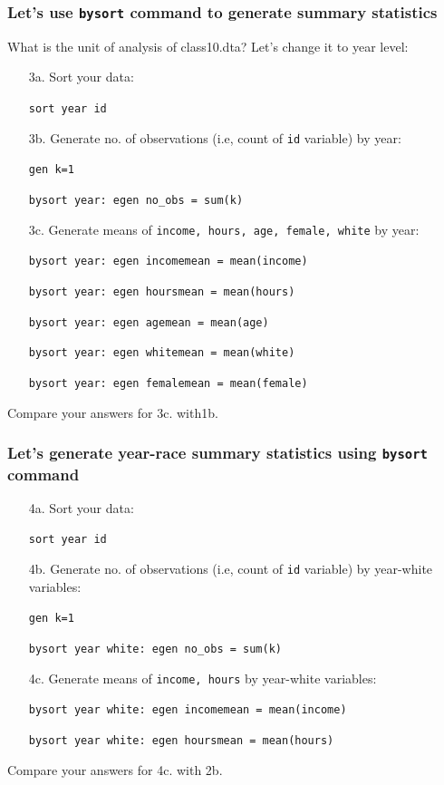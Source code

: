 \documentclass[11pt]{beamer}
\begin{document}
\begin{frame}
\frametitle{Let's use \texttt{bysort} command to generate summary statistics}
What is the unit of analysis of class10.dta? \pause
Let's change it to year level: \\ \pause
\begin{itemize}
	\item[3a.] Sort your data: \pause
	\item[   ] \texttt{sort year id} \pause \bigskip
	\item[3b.] Generate no. of observations (i.e, count of \texttt{id} variable) by year: \pause
	\item[   ] \texttt{gen k=1}
	\item[   ] \texttt{bysort year: egen no\_obs = sum(k)} \pause \bigskip
	\item[3c.] Generate means of \texttt{income, hours, age, female, white} by year: \pause
	\item[   ] \texttt{bysort year: egen incomemean = mean(income)}
	\item[   ] \texttt{bysort year: egen hoursmean = mean(hours)}
	\item[   ] \texttt{bysort year: egen agemean = mean(age)}
	\item[   ] \texttt{bysort year: egen whitemean = mean(white)}
	\item[   ] \texttt{bysort year: egen femalemean = mean(female)}
\end{itemize} 
\bigskip
Compare your answers for 3c. with1b.
\end{frame}



\begin{frame}
\frametitle{Let's generate year-race summary statistics using \texttt{bysort} command}
\begin{itemize}
	\item[4a.] Sort your data: 
	\item[   ] \texttt{sort year id} \pause \bigskip
	\item[4b.] Generate no. of observations (i.e, count of \texttt{id} variable) by year-white variables: 
	\item[   ] \texttt{gen k=1} \pause
	\item[   ] \texttt{bysort year white: egen no\_obs = sum(k)} \pause \bigskip
	\item[4c.] Generate means of \texttt{income, hours} by year-white variables: \pause
	\item[   ] \texttt{bysort year white: egen incomemean = mean(income)}
	\item[   ] \texttt{bysort year white: egen hoursmean = mean(hours)}
\end{itemize} 
\bigskip
Compare your answers for 4c. with 2b.
\end{frame}
\end{document}
